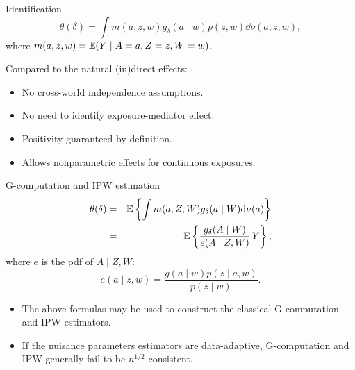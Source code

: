 \documentclass{beamer}
\begin{document}

\begin{frame}{Identification}
  \begin{equation*}
    \theta(\delta) = \int m(a, z,
    w)g_\delta(a\mid w)p(z,w)\dd\nu(a,z,w),
  \end{equation*}
where $m(a, z, w) = \mathbb{E}(Y\mid A=a, Z=z, W=w)$.
  \begin{block}{Compared to the natural (in)direct effects:}
    \begin{itemize}
    \item No cross-world independence assumptions.
    \item No need to identify exposure-mediator effect.
    \item Positivity guaranteed by definition.
    \item Allows nonparametric effects for continuous exposures.
    \end{itemize}
  \end{block}

\note{
}

\end{frame}


\begin{frame}{G-computation and IPW estimation}
  \begin{eqnarray*}
    \theta(\delta) &=& \mathbb{E}\left\{\int m(a, Z, W)
                       g_\delta(a \mid W)\mathrm{d}\nu(a) \right\}\label{eq:gcomp}\\
                   &=& \mathbb{E} \left\{\frac{g_\delta(A \mid W)}
                       {e(A \mid Z, W)}\, Y \right\},
  \end{eqnarray*}
  where $e$ is the pdf of $A\mid Z,W$:
  \[e(a \mid z, w) = \frac{g(a\mid w) p(z\mid a, w)}{p(z\mid w)}.\]
  \begin{itemize}
  \item The above formulas may be used to construct the classical G-computation
    and IPW estimators.
  \item If the nuisance parameters estimators are data-adaptive, G-computation
    and IPW generally fail to be $n^{1/2}$-consistent.
  \end{itemize}

\note{
}

\end{frame}
\end{document}
